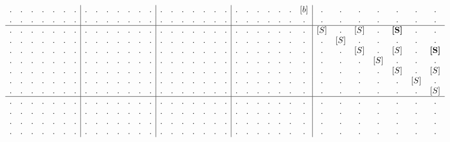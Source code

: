 \begin{example}
\begin{align}
\begin{array}{c c c c c c c | c c c c c c c | c c c c c c c | c c c c c c c | c c c c c c c}
. & . & . & . & . & . & .  &  . & . & . & . & . & . & .  &  . & . & . & . & . & . & .  &  . & . & .   & . & .   & . & [b]  &  . & . & . & . & . & . & .   \\
. & . & . & . & . & . & .  &  . & . & . & . & . & . & .  &  . & . & . & . & . & . & .  &  . & . & .   & . & .   & . & .    &  . & . & . & . & . & . & .   \\
\hline
. & . & . & . & . & . & .  &  . & . & . & . & . & . & .  &  . & . & . & . & . & . & .  &  . & . & . & . & . & . & .  &  [S] & .   & [S] & .   & \textbf{[S]} & .   & .             \\
. & . & . & . & . & . & .  &  . & . & . & . & . & . & .  &  . & . & . & . & . & . & .  &  . & . & . & . & . & . & .  &  .   & [S] & .   & .   & .            & .   & .             \\
. & . & . & . & . & . & .  &  . & . & . & . & . & . & .  &  . & . & . & . & . & . & .  &  . & . & . & . & . & . & .  &  .   & .   & [S] & .   & [S]          & .   & \textbf{[S]}  \\
. & . & . & . & . & . & .  &  . & . & . & . & . & . & .  &  . & . & . & . & . & . & .  &  . & . & . & . & . & . & .  &  .   & .   & .   & [S] & .            & .   & .             \\
. & . & . & . & . & . & .  &  . & . & . & . & . & . & .  &  . & . & . & . & . & . & .  &  . & . & . & . & . & . & .  &  .   & .   & .   & .   & [S]          & .   & [S]           \\
. & . & . & . & . & . & .  &  . & . & . & . & . & . & .  &  . & . & . & . & . & . & .  &  . & . & . & . & . & . & .  &  .   & .   & .   & .   & .            & [S] & .             \\
. & . & . & . & . & . & .  &  . & . & . & . & . & . & .  &  . & . & . & . & . & . & .  &  . & . & . & . & . & . & .  &  .   & .   & .   & .   & .            & .   & [S]           \\
\hline
. & . & . & . & . & . & .  &  . & . & . & . & . & . & .  &  . & . & . & . & . & . & .  &  . & . & . & . & . & . & .  &  . & . & . & . & . & . & .   \\
. & . & . & . & . & . & .  &  . & . & . & . & . & . & .  &  . & . & . & . & . & . & .  &  . & . & . & . & . & . & .  &  . & . & . & . & . & . & .   \\
. & . & . & . & . & . & .  &  . & . & . & . & . & . & .  &  . & . & . & . & . & . & .  &  . & . & . & . & . & . & .  &  . & . & . & . & . & . & .   \\
. & . & . & . & . & . & .  &  . & . & . & . & . & . & .  &  . & . & . & . & . & . & .  &  . & . & . & . & . & . & .  &  . & . & . & . & . & . & .   \\

\end{array}
\end{align}
\end{example}
